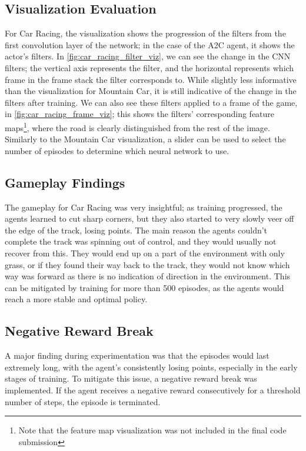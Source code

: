 \subsection{Visualization Evaluation}
For Car Racing, the visualization shows the progression of the filters from the
first convolution layer of the network; in the case of the A2C agent, it shows
the actor's filters. In \autoref{fig:car_racing_filter_viz}, we can see the
change in the CNN filters; the vertical axis represents the filter, and the
horizontal represents which frame in the frame stack the filter corresponds to.
While slightly less informative than the visualization for Mountain Car, it is
still indicative of the change in the filters after training. We can also see
these filters applied to a frame of the game, in
\autoref{fig:car_racing_frame_viz}; this shows the filters' corresponding
feature maps\footnote{Note that the feature map visualization was not included
  in the final code submission}, where the road is clearly distinguished from the
rest of the image. Similarly to the Mountain Car visualization, a slider can be
used to select the number of episodes to determine which neural network to use.





\subsection{Gameplay Findings}
The gameplay for Car Racing was very insightful; as training progressed, the
agents learned to cut sharp corners, but they also started to very slowly veer
off the edge of the track, losing points. The main reason the agents couldn't
complete the track was spinning out of control, and they would usually not
recover from this. They would end up on a part of the environment with only
grass, or if they found their way back to the track, they would not know which
way was forward as there is no indication of direction in the environment. This
can be mitigated by training for more than 500 episodes, as the agents would
reach a more stable and optimal policy.

\subsection{Negative Reward Break}
A major finding during experimentation was that the episodes would last
extremely long, with the agent's consistently losing points, especially in the
early stages of training. To mitigate this issue, a negative reward break was
implemented. If the agent receives a negative reward consecutively for a
threshold number of steps, the episode is terminated.


